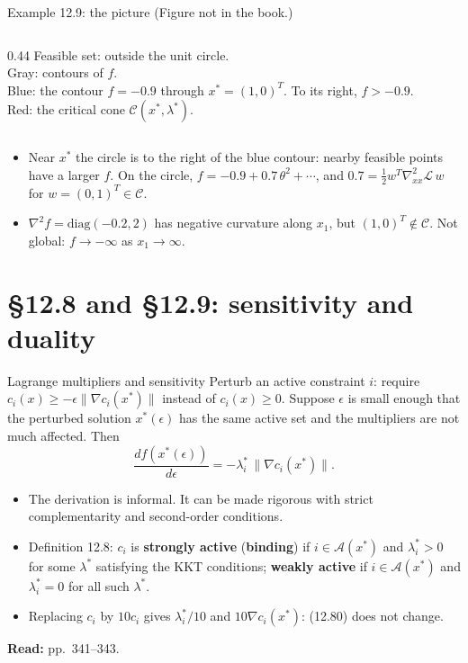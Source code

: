 \documentclass[aspectratio=169,12pt]{beamer}
\newcommand{\xs}{x^{*}}
\newcommand{\hessf}{\nabla^{2} f}
\newcommand{\readbook}[1]{{\color{red}\textbf{Read:} #1}}
\newcommand{\ls}{\lambda^{*}}
\newcommand{\cA}{\mathcal{A}}
\newcommand{\cC}{\mathcal{C}}
\newcommand{\cL}{\mathcal{L}}
\newcommand{\hessL}{\nabla_{xx}^{2}\cL}
\begin{document}
\begin{frame}{Example 12.9: the picture {\normalfont\small(Figure not in the book.)}}
\begin{columns}[T,totalwidth=\textwidth]
    \begin{column}{0.44\textwidth}
      \vspace{0.6em}
      Feasible set: outside the unit circle.\\[0.3em]
      Gray: contours of $f$.\\[0.3em]
      {\color{blue!70!black}Blue}: the contour $f=-0.9$ through $\xs=(1,0)^{T}$.
      To its right, $f>-0.9$.\\[0.3em]
      {\color{red!70!black}Red}: the critical cone $\cC(\xs,\ls)$.
    \end{column}
  \end{columns}
  \begin{itemize}\setlength\itemsep{0.2em}
    \item Near $\xs$ the circle is to the right of the blue contour: nearby feasible points have a larger $f$.
      On the circle, $f=-0.9+0.7\,\theta^{2}+\cdots$, and $0.7=\tfrac12 w^{T}\hessL\,w$ for $w=(0,1)^{T}\in\cC$.
    \item $\hessf=\mathrm{diag}(-0.2,2)$ has negative curvature along $x_{1}$, but $(1,0)^{T}\notin\cC$.
      Not global: $f\to-\infty$ as $x_{1}\to\infty$.
  \end{itemize}
\end{frame}


\section{\S12.8 and \S12.9: sensitivity and duality}

\begin{frame}{Lagrange multipliers and sensitivity}
  Perturb an active constraint $i$: require $c_{i}(x)\ge-\epsilon\|\nabla c_{i}(\xs)\|$ instead of
  $c_{i}(x)\ge 0$. Suppose $\epsilon$ is small enough that the perturbed solution $\xs(\epsilon)$ has
  the same active set and the multipliers are not much affected. Then
  \[ \frac{d f(\xs(\epsilon))}{d\epsilon}=-\ls_{i}\,\|\nabla c_{i}(\xs)\| . \tag{12.80} \]
  \begin{itemize}\setlength\itemsep{0.25em}
    \item The derivation is informal. It can be made rigorous with strict complementarity and
      second-order conditions.
    \item Definition 12.8: $c_{i}$ is \textbf{strongly active} (\textbf{binding}) if $i\in\cA(\xs)$ and
      $\ls_{i}>0$ for some $\ls$ satisfying the KKT conditions; \textbf{weakly active} if $i\in\cA(\xs)$ and
      $\ls_{i}=0$ for all such $\ls$.
    \item Replacing $c_{i}$ by $10c_{i}$ gives $\ls_{i}/10$ and $10\nabla c_{i}(\xs)$:
      (12.80) does not change.
  \end{itemize}
  \readbook{pp.~341--343.}
\end{frame}
\end{document}
